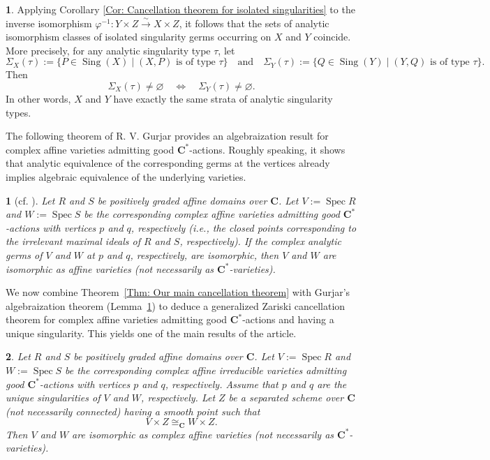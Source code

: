 \documentclass[english,10pt,reqno,twoside]{amsart}
\numberwithin{equation}{section}
\numberwithin{figure}{section}
\theoremstyle{plain}
\newtheorem{thm}{\protect\theoremname}
\theoremstyle{plain}
\newtheorem{lem}[thm]{\protect\lemmaname}
\theoremstyle{definition}
\newtheorem{rem}{\protect\remarkname}
\providecommand{\lemmaname}{Lemma}
\providecommand{\theoremname}{Theorem}
\providecommand{\remarkname}{Remark}
\theoremstyle{plain}
\numberwithin{equation}{section}
\newcommand{\C}{\mathbf{C}}
\newcommand{\Spec}{\operatorname{Spec}}
\newcommand{\Sing}{\operatorname{Sing}}
\begin{document}
\begin{rem}
Applying Corollary \ref{Cor: Cancellation theorem for isolated singularities} to the inverse isomorphism $\varphi^{-1}: Y\times Z \xrightarrow{\sim} X\times Z$, it follows that the sets of analytic isomorphism classes of isolated singularity germs occurring on $X$ and $Y$ coincide. More precisely, for any analytic singularity type $\tau$, let
\[
\Sigma_X(\tau):=\{P\in \Sing(X)\mid (X,P)\text{ is of type }\tau\}
\quad \text{and} \quad
\Sigma_Y(\tau):=\{Q\in \Sing(Y)\mid (Y,Q)\text{ is of type }\tau\}.
\]
Then
\[
\Sigma_X(\tau)\neq \varnothing
\quad\iff\quad
\Sigma_Y(\tau)\neq \varnothing.
\]
In other words, $X$ and $Y$ have exactly the same strata of analytic singularity types.
\end{rem}

The following theorem of R. V. Gurjar provides an algebraization result for complex affine varieties admitting good $\C^*$-actions. Roughly speaking, it shows that analytic equivalence of the corresponding germs at the vertices already implies algebraic equivalence of the underlying varieties.


\begin{lem}[{cf. \cite[Theorem 2]{Gur2020}}]\label{Lem: Gurjar's result}
Let $R$ and $S$ be positively graded affine domains over $\C$. Let $V:=\Spec R$ and $W:=\Spec S$ be the corresponding complex affine varieties admitting good $\C^*$-actions with vertices $p$ and $q$, respectively (i.e., the closed points corresponding to the irrelevant maximal ideals of $R$ and $S$, respectively). If the complex analytic germs of $V$ and $W$ at $p$ and $q$, respectively, are isomorphic, then $V$ and $W$ are isomorphic as affine varieties (not necessarily as $\C^*$-varieties).
\end{lem}

We now combine Theorem~\ref{Thm: Our main cancellation theorem} with Gurjar's algebraization theorem (Lemma~\ref{Lem: Gurjar's result}) to deduce a generalized Zariski cancellation theorem for complex affine varieties admitting good $\C^*$-actions and having a unique singularity. This yields one of the main results of the article.


\begin{thm}\label{Thm: Our main cancellation theorem for C*-varieties}
Let $R$ and $S$ be positively graded affine domains over $\C$. Let $V:=\Spec R$ and $W:=\Spec S$ be the corresponding complex affine irreducible varieties admitting good $\C^*$-actions with vertices $p$ and $q$, respectively. Assume that $p$ and $q$ are the unique singularities of $V$ and $W$, respectively. Let $Z$ be a separated scheme over $\C$ (not necessarily connected) having a smooth point such that
\[
V\times Z \cong_{\C} W\times Z.
\]
Then $V$ and $W$ are isomorphic as complex affine varieties (not necessarily as $\C^*$-varieties).
\end{thm}
\end{document}
